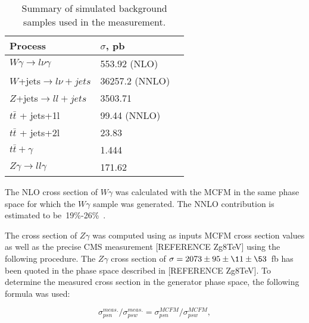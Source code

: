 \begin{table}[h]
  \scriptsize
  \begin{center}
    \caption{Summary of simulated background samples used in the measurement.}
    \begin{tabular}{|l|l|l|}
      \hline
      Process                      & $\sigma$, pb         \\ \hline
      $W\gamma \rightarrow l\nu\gamma$     & 553.92 (NLO)    \\
      $W$+jets$ \rightarrow l\nu + jets$          & 36257.2 (NNLO)  \\ 
      $Z$+jets$ \rightarrow ll + jets$            & 3503.71         \\
      $t\bar{t}$ + jets+1l                    & 99.44 (NNLO)   \\
      $t\bar{t}$ + jets+2l                    & 23.83         \\
      $t\bar{t} + \gamma$                    & 1.444          \\
      $Z\gamma \rightarrow ll\gamma$       & 171.62           \\
      \hline
    \end{tabular}
    \label{tab:mc_bkg_samples}
  \end{center}
\end{table} 

The NLO cross section of $W\gamma$ was calculated with the MCFM in the same phase space for which the $W\gamma$ sample was generated. The NNLO contribution is estimated to be~19\%-26\%~\cite{ref_theory_NNLO}.

The cross section of $Z\gamma$ was computed using as inputs MCFM cross section values as well as the precise CMS measurement [REFERENCE Zg8TeV] using the following procedure. The $Z\gamma$ cross section of $\sigma = 2073 \pm 95 \pm \11 \pm \53$~fb has been quoted in the phase space described in [REFERENCE Zg8TeV]. To determine the measured cross section in the generator phase space, the following formula was used:

\begin{equation}
\sigma_{psn}^{meas.}/\sigma_{psw}^{meas.} = \sigma_{psn}^{MCFM}/\sigma_{psw}^{MCFM},
\end{equation}

